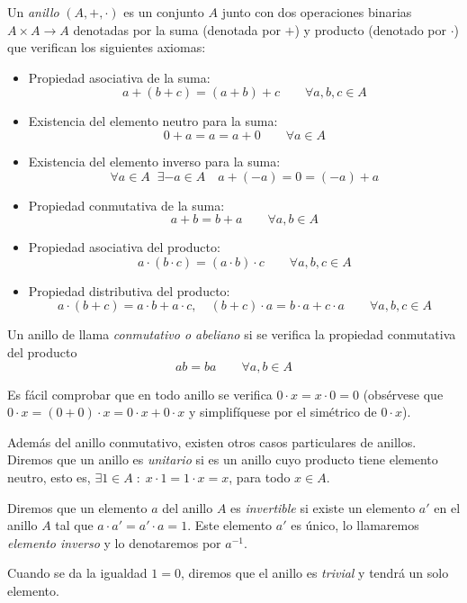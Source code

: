 \begin{definition}
    Un \emph{anillo} $(A, +, \cdot )$ es un conjunto $A$ junto con dos operaciones binarias $A \times A \rightarrow A$ denotadas por la suma (denotada por $+$) y producto (denotado por $\cdot$) que verifican los siguientes axiomas:

    \begin{itemize}
        \item Propiedad asociativa de la suma: 
        $$  a + (b + c) = (a + b) + c \qquad \forall a,b,c \in A$$
        \item Existencia del elemento neutro para la suma:
        $$ 0 + a = a = a + 0 \qquad \forall a \in A$$
        \item Existencia del elemento inverso para la suma:
        $$ \forall a \in A \; \; \exists -a \in A \quad a + (-a) = 0 = (-a) + a $$
        \item Propiedad conmutativa de la suma:
        $$ a + b = b + a \qquad \forall a,b \in A $$
        \item Propiedad asociativa del producto:
        $$ a \cdot (b \cdot c) = (a \cdot b) \cdot c \qquad \forall a,b,c \in A $$
        \item Propiedad distributiva del producto:
        $$ a \cdot (b + c) = a \cdot b + a \cdot c, \quad (b + c) \cdot a = b \cdot a + c \cdot a \qquad \forall a,b,c \in A $$
    \end{itemize}

    Un anillo de llama \emph{conmutativo o abeliano} si se verifica la propiedad conmutativa del producto 
    \[ 
        ab = ba \qquad \forall a,b \in A 
    \]
\end{definition}

Es fácil comprobar que en todo anillo se verifica $0 \cdot x = x \cdot 0 = 0$ (obsérvese que $0 \cdot x = (0 + 0) \cdot x = 0 \cdot x + 0 \cdot x$ y simplifíquese por el simétrico de $0 \cdot x$).

Además del anillo conmutativo, existen otros casos particulares de anillos. Diremos que un anillo es \emph{unitario} si es un anillo cuyo producto tiene elemento neutro, esto es, $\exists 1 \in A \; : \; x \cdot 1 = 1 \cdot x = x$, para todo $x \in A$.

Diremos que un elemento $a$ del anillo $A$ es \emph{invertible} si existe un elemento $a'$ en el anillo $A$ tal que $a \cdot a' = a' \cdot a = 1$. Este elemento $a'$ es único, lo llamaremos \emph{elemento inverso} y lo denotaremos por $a^{-1}$.

Cuando se da la igualdad $1 = 0$, diremos que el anillo es \emph{trivial} y tendrá un solo elemento.

